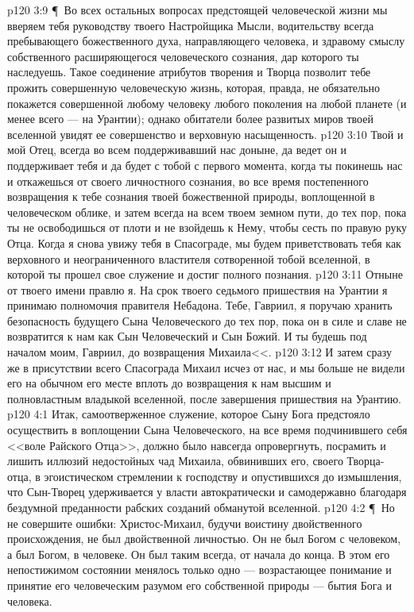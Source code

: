 \vs p120 3:9 \P\ \bibnobreakspace Во всех остальных вопросах предстоящей человеческой жизни мы вверяем тебя руководству твоего Настройщика Мысли, водительству всегда пребывающего божественного духа, направляющего человека, и здравому смыслу собственного расширяющегося человеческого сознания, дар которого ты наследуешь. Такое соединение атрибутов творения и Творца позволит тебе прожить совершенную человеческую жизнь, которая, правда, не обязательно покажется совершенной любому человеку любого поколения на любой планете (и менее всего --- на Урантии); однако обитатели более развитых миров твоей вселенной увидят ее совершенство и верховную насыщенность.
\vs p120 3:10 Твой и мой Отец, всегда во всем поддерживавший нас доныне, да ведет он и поддерживает тебя и да будет с тобой с первого момента, когда ты покинешь нас и откажешься от своего личностного сознания, во все время постепенного возвращения к тебе сознания твоей божественной природы, воплощенной в человеческом облике, и затем всегда на всем твоем земном пути, до тех пор, пока ты не освободишься от плоти и не взойдешь к Нему, чтобы сесть по правую руку Отца. Когда я снова увижу тебя в Спасограде, мы будем приветствовать тебя как верховного и неограниченного властителя сотворенной тобой вселенной, в которой ты прошел свое служение и достиг полного познания.
\vs p120 3:11 Отныне от твоего имени правлю я. На срок твоего седьмого пришествия на Урантии я принимаю полномочия правителя Небадона. Тебе, Гавриил, я поручаю хранить безопасность будущего Сына Человеческого до тех пор, пока он в силе и славе не возвратится к нам как Сын Человеческий и Сын Божий. И ты будешь под началом моим, Гавриил, до возвращения Михаила<<.
\separatorline
\vs p120 3:12 И затем сразу же в присутствии всего Спасограда Михаил исчез от нас, и мы больше не видели его на обычном его месте вплоть до возвращения к нам высшим и полновластным владыкой вселенной, после завершения пришествия на Урантию.
\vs p120 4:1 Итак, самоотверженное служение, которое Сыну Бога предстояло осуществить в воплощении Сына Человеческого, на все время подчинившего себя <<воле Райского Отца>>, должно было навсегда опровергнуть, посрамить и лишить иллюзий недостойных чад Михаила, обвинивших его, своего Творца\hyp{}отца, в эгоистическом стремлении к господству и опустившихся до измышления, что Сын\hyp{}Творец удерживается у власти автократически и самодержавно благодаря бездумной преданности рабских созданий обманутой вселенной.
\vs p120 4:2 \P\ Но не совершите ошибки: Христос\hyp{}Михаил, будучи воистину двойственного происхождения, не был двойственной личностью. Он не был Богом  с человеком, а был Богом,  в человеке. Он был таким всегда, от начала до конца. В этом его непостижимом состоянии менялось только одно --- возрастающее понимание и принятие его человеческим разумом его собственной природы --- бытия Бога и человека.
